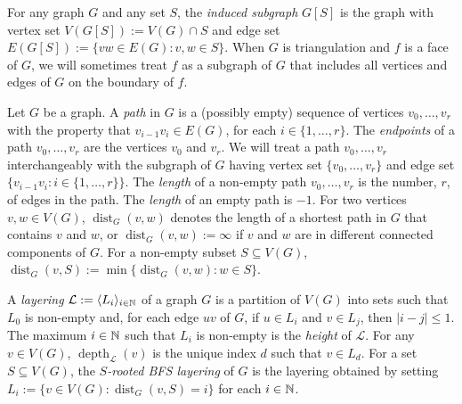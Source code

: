 \documentclass{patmorin}
\DeclareMathOperator{\height}{height}
\DeclareMathOperator{\depth}{depth}
\DeclareMathOperator{\dist}{dist}
\begin{document}
For any graph $G$ and any set $S$, the \emph{induced subgraph} $G[S]$ is the graph with vertex set $V(G[S]):=V(G)\cap S$ and edge set $E(G[S]):=\{vw\in E(G):v,w\in S\}$.  When $G$ is triangulation and $f$ is a face of $G$, we will sometimes treat $f$ as a subgraph of $G$ that includes all vertices and edges of $G$ on the boundary of $f$.

Let $G$ be a graph. A \emph{path} in $G$ is a (possibly empty) sequence of vertices $v_0,\ldots,v_r$ with the property that $v_{i-1}v_i\in E(G)$, for each $i\in\{1,\ldots,r\}$.  The \emph{endpoints} of a path $v_0,\ldots,v_r$ are the vertices $v_0$ and $v_r$.  We will treat a path $v_0,\ldots,v_r$ interchangeably with the subgraph of $G$ having vertex set $\{v_0,\ldots,v_r\}$ and edge set $\{v_{i-1}v_i:i\in\{1,\ldots,r\}\}$.  The \emph{length} of a non-empty path $v_0,\ldots,v_r$ is the number, $r$, of edges in the path.  The \emph{length} of an empty path is $-1$. For two vertices $v,w\in V(G)$, $\dist_G(v,w)$ denotes the length of a shortest path in $G$ that contains $v$ and $w$, or $\dist_G(v,w):=\infty$ if $v$ and $w$ are in different connected components of $G$.  For a non-empty subset $S\subseteq V(G)$, $\dist_G(v,S):=\min\{\dist_G(v,w):w\in S\}$.


A \emph{layering} $\mathcal{L}:=\langle L_i\rangle_{i\in\mathbb{N}}$ of a graph $G$ is a partition of $V(G)$ into sets such that $L_0$ is non-empty and, for each edge $uv$ of $G$, if $u\in L_i$ and $v\in L_j$, then $|i-j|\le 1$.  The maximum $i\in\mathbb{N}$ such that $L_i$ is non-empty is the \emph{height} of $\mathcal{L}$.
For any $v\in V(G)$, $\depth_\mathcal{L}(v)$ is the unique index $d$ such that $v\in L_d$. For a set $S\subseteq V(G)$, the \emph{$S$-rooted BFS layering} of $G$ is the layering obtained by setting $L_i:=\{v\in V(G):\dist_G(v,S)=i\}$ for each $i\in\mathbb{N}$.
\end{document}
